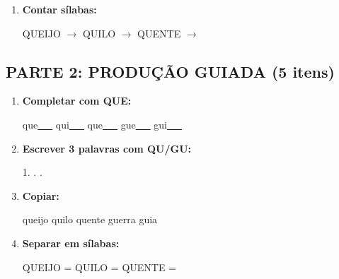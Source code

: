 \begin{exercicio}
\begin{enumerate}
  \item \textbf{Contar sílabas:}
  \begin{center}
  QUEIJO $\rightarrow$ \underline{\hspace{0.9cm}} \quad QUILO $\rightarrow$ \underline{\hspace{0.9cm}} \quad QUENTE $\rightarrow$ \underline{\hspace{0.9cm}}
  \end{center}

\end{enumerate}

\subsection*{PARTE 2: PRODUÇÃO GUIADA (5 itens)}

\begin{enumerate}[resume]

  \item \textbf{Completar com QUE:}
  \begin{center}
  que\underline{~~~} \quad qui\underline{~~~} \quad que\underline{~~~} \quad gue\underline{~~~} \quad gui\underline{~~~}
  \end{center}

  \item \textbf{Escrever 3 palavras com QU/GU:}
  \begin{center}
  1. \underline{\hspace{3cm}} . \underline{\hspace{3cm}} . \underline{\hspace{3cm}}
  \end{center}

  \item \textbf{Copiar:}
  \begin{center}
  queijo \quad quilo \quad quente \quad guerra \quad guia
  \end{center}

  \item \textbf{Separar em sílabas:}
  \begin{center}
  QUEIJO = \underline{\hspace{1cm}} \underline{\hspace{1cm}} \quad QUILO = \underline{\hspace{1cm}} \underline{\hspace{1cm}} \quad QUENTE = \underline{\hspace{1cm}} \underline{\hspace{1cm}}
  \end{center}


\end{enumerate}
\end{exercicio}
